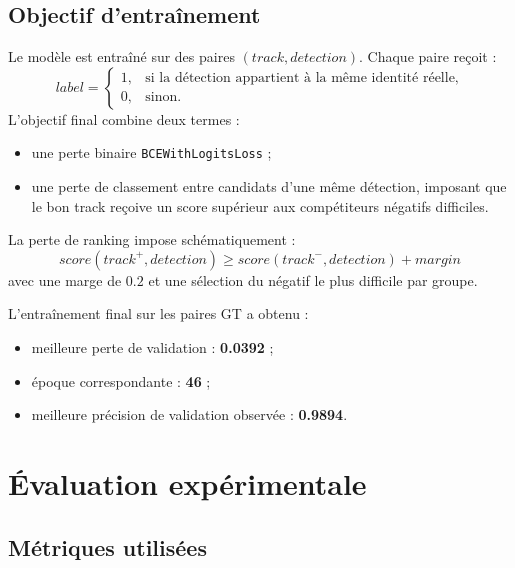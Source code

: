 \documentclass[11pt,a4paper]{article}
\begin{document}
\subsection{Objectif d'entraînement}

Le modèle est entraîné sur des paires \((track, detection)\). Chaque paire reçoit :
\[
label =
\begin{cases}
    1, & \text{si la détection appartient à la même identité réelle,} \\
    0, & \text{sinon.}
\end{cases}
\]
L'objectif final combine deux termes :
\begin{itemize}
    \item une perte binaire \texttt{BCEWithLogitsLoss} ;
    \item une perte de classement entre candidats d'une même détection, imposant que le bon track reçoive un score supérieur aux compétiteurs négatifs difficiles.
\end{itemize}

La perte de ranking impose schématiquement :
\[
score(track^+, detection) \geq score(track^-, detection) + margin
\]
avec une marge de $0.2$ et une sélection du négatif le plus difficile par groupe.

L'entraînement final sur les paires GT a obtenu :
\begin{itemize}
    \item meilleure perte de validation : \textbf{0.0392} ;
    \item époque correspondante : \textbf{46} ;
    \item meilleure précision de validation observée : \textbf{0.9894}.
\end{itemize}

\section{Évaluation expérimentale}

\subsection{Métriques utilisées}
\end{document}
